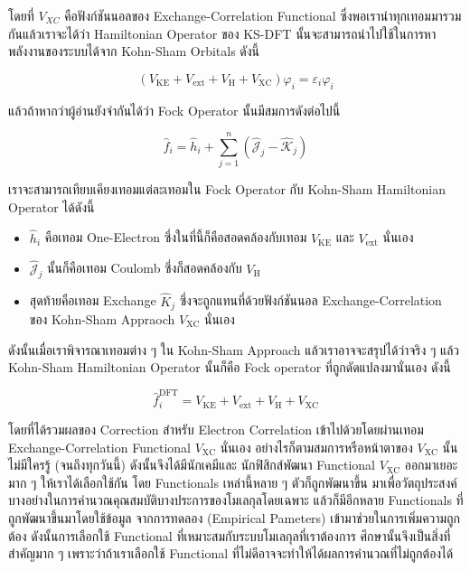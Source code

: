 \noindent โดยที่ $V_{X C}$ คือฟังก์ชันนอลของ Exchange-Correlation Functional ซึ่งพอเรานำทุกเทอมมารวมกันแล้วเราจะได้ว่า
Hamiltonian Operator ของ KS-DFT นั้นจะสามารถนำไปใช้ในการหาพลังงานของระบบได้จาก Kohn-Sham Orbitals ดังนี้

\begin{equation}
    \label{eq:Kohn_Sham_Equation}
    \left(
    V_{\mathrm{KE}}
    + V_{\mathrm{ext}}
    + V_{\mathrm{H}}
    + V_{\mathrm{XC}}
    \right)
    \varphi_i
    =
    \varepsilon_i \varphi_i
\end{equation}

\noindent แล้วถ้าหากว่าผู้อ่านยังจำกันได้ว่า Fock Operator นั้นมีสมการดังต่อไปนี้

\begin{equation}
    \hat{f}_i
    =
    \hat{h}_i + \sum_{j=1}^n \left(\hat{\mathscr{J}}_j - \hat{\mathscr{K}}_j\right)
\end{equation}

\noindent เราจะสามารถเทียบเคียงเทอมแต่ละเทอมใน Fock Operator กับ Kohn-Sham Hamiltonian Operator ได้ดังนี้

\begin{itemize}[topsep=0pt,noitemsep]
    \setlength\itemsep{1em}
    \item $\hat{h}_i$ คือเทอม One-Electron ซึ่งในที่นี้ก็คือสอดคล้องกับเทอม $V_{\mathrm{KE}}$ และ $V_{\mathrm{ext}}$ นั่นเอง

    \item $\hat{\mathcal{J}}_j$ นั้นก็คือเทอม Coulomb ซึ่งก็สอดคล้องกับ $V_{\mathrm{H}}$

    \item สุดท้ายคือเทอม Exchange $\hat{K}_j$ ซึ่งจะถูกแทนที่ด้วยฟังก์ชันนอล Exchange-Correlation ของ Kohn-Sham Appraoch
          $V_{\mathrm{XC}}$ นั่นเอง
\end{itemize}

ดังนั้นเมื่อเราพิจารณาเทอมต่าง ๆ ใน Kohn-Sham Approach แล้วเราอาจจะสรุปได้ว่าจริง ๆ แล้ว Kohn-Sham Hamiltonian Operator นั้นก็คือ
Fock operator ที่ถูกดัดแปลงมานั่นเอง ดังนี้

\begin{equation}
    \hat{f}_i^{\mathrm{DFT}}
    =
    V_{\mathrm{KE}}
    + V_{\mathrm{ext}}
    + V_{\mathrm{H}}
    + V_{\mathrm{XC}}
\end{equation}

\noindent โดยที่ได้รวมผลของ Correction สำหรับ Electron Correlation เข้าไปด้วยโดยผ่านเทอม Exchange-Correlation Functional
$V_{\mathrm{XC}}$ นั่นเอง อย่างไรก็ตามสมการหรือหน้าตาของ $V_{\mathrm{XC}}$ นั้นไม่มีใครรู้ (จนถึงทุกวันนี้) ดังนั้นจึงได้มีนักเคมีและ%
นักฟิสิกส์พัฒนา Functional $V_{\mathrm{XC}}$ ออกมาเยอะมาก ๆ ให้เราได้เลือกใช้กัน โดย Functionals เหล่านี้หลาย ๆ ตัวก็ถูกพัฒนาขึ้น%
มาเพื่อวัตถุประสงค์บางอย่างในการคำนวณคุณสมบัติบางประการของโมเลกุลโดยเฉพาะ แล้วก็มีอีกหลาย Functionals ที่ถูกพัฒนาขึ้นมาโดยใช้ข้อมูล%
จากการทดลอง (Empirical Pameters) เข้ามาช่วยในการเพิ่มความถูกต้อง ดังนั้นการเลือกใช้ Functional ที่เหมาะสมกับระบบโมเลกุลที่เราต้องการ%
ศึกษานั้นจึงเป็นสิ่งที่สำคัญมาก ๆ เพราะว่าถ้าเราเลือกใช้ Functional ที่ไม่ดีอาจจะทำให้ได้ผลการคำนวณที่ไม่ถูกต้องได้

